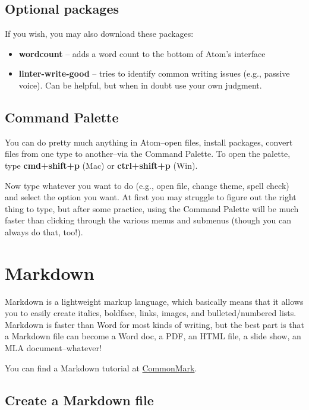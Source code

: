 \documentclass[]{book}
\providecommand{\tightlist}{%
  \setlength{\itemsep}{0pt}\setlength{\parskip}{0pt}}
\theoremstyle{definition}
\theoremstyle{definition}
\theoremstyle{definition}
\theoremstyle{remark}
\begin{document}
\hypertarget{optional-packages}{%
\section{Optional packages}\label{optional-packages}}

If you wish, you may also download these packages:

\begin{itemize}
\tightlist
\item
  \textbf{wordcount} -- adds a word count to the bottom of Atom's
  interface
\item
  \textbf{linter-write-good} -- tries to identify common writing issues
  (e.g., passive voice). Can be helpful, but when in doubt use your own
  judgment.
\end{itemize}

\hypertarget{command-palette}{%
\section{Command Palette}\label{command-palette}}

You can do pretty much anything in Atom--open files, install packages,
convert files from one type to another--via the Command Palette. To open
the palette, type \textbf{cmd+shift+p} (Mac) or \textbf{ctrl+shift+p}
(Win).

Now type whatever you want to do (e.g., open file, change theme, spell
check) and select the option you want. At first you may struggle to
figure out the right thing to type, but after some practice, using the
Command Palette will be much faster than clicking through the various
menus and submenus (though you can always do that, too!).

\hypertarget{markdown}{%
\chapter{Markdown}\label{markdown}}

Markdown is a lightweight markup language, which basically means that it
allows you to easily create italics, boldface, links, images, and
bulleted/numbered lists. Markdown is faster than Word for most kinds of
writing, but the best part is that a Markdown file can become a Word
doc, a PDF, an HTML file, a slide show, an MLA document--whatever!

You can find a Markdown tutorial at
\href{https://commonmark.org/help/tutorial/}{CommonMark}.

\hypertarget{create-a-markdown-file}{%
\section{Create a Markdown file}\label{create-a-markdown-file}}
\end{document}
